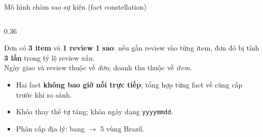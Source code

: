 \documentclass[aspectratio=169,10pt,xcolor=table]{beamer}
\begin{document}
\begin{frame}{Mô hình chòm sao sự kiện (fact constellation)}
\begin{columns}[c]
\begin{column}{0.36\textwidth}
\begin{keybox}[title={Vì sao tách hai grain?},coltitle=white,colbacktitle=bkblue,fonttitle=\small\bfseries]
        Đơn có \textbf{3 item} và \textbf{1 review 1 sao}: nếu gắn review vào từng item, đơn đó bị tính \textbf{3 lần} trong tỷ lệ review xấu.\\[0.1cm]
        Ngày giao và review thuộc về \emph{đơn}; doanh thu thuộc về \emph{item}.
      \end{keybox}
      \footnotesize
      \begin{itemize}
        \item Hai fact \textbf{không bao giờ nối trực tiếp}; tổng hợp từng fact về cùng cấp trước khi so sánh.
        \item Khóa thay thế tự tăng; khóa ngày dạng \texttt{yyyymmdd}.
        \item Phân cấp địa lý: bang $\to$ 5 vùng Brazil.
      \end{itemize}
    \end{column}
  \end{columns}
\end{frame}
\end{document}
